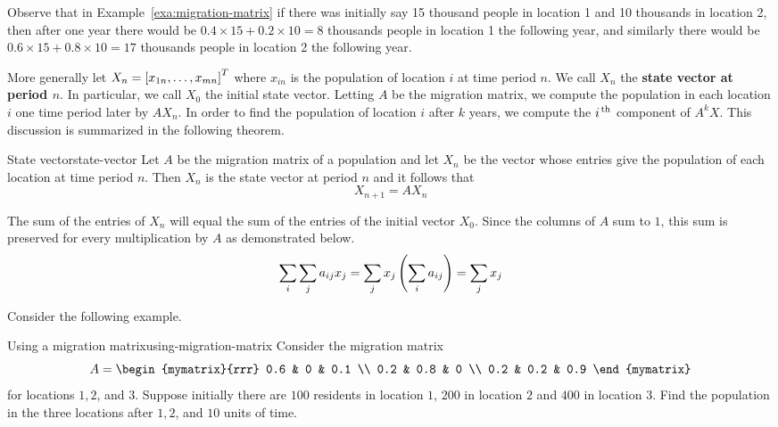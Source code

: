 Observe that in Example~\ref{exa:migration-matrix} if there was initially say 15
thousand people in location 1 and 10 thousands in location 2, then
after one year there would be $0.4 \times 15 + 0.2 \times 10 = 8$
thousands people in location 1 the following year, and similarly 
there would be $0.6 \times 15 + 0.8 \times 10 = 17$
thousands people in location 2 the following year.

More generally let $X_n=\left[x_{1n}, \ldots, x_{mn}\right] ^{T}$ where $x_{in}$ is the
population of location $i$ at time period $n$. We call $X_n$ the \textbf{state vector at period $n$}. In particular, we call $X_0$ the initial state vector. Letting $A$ be the migration matrix, we compute the population in each location $i$ one time period later by $AX_n$. In order to find the population of location $i$ after $k$
years, we compute the $i^{\,\rm th}$ component of $A^{k}X$. This discussion is summarized in the following theorem. 

\begin{theorem}{State vector}{state-vector}
Let $A$ be the migration matrix of a population and let $X_n$ be the vector whose entries give the population of each location at time period $n$. Then $X_n$ is the state vector at period $n$ and it follows that 
\[
X_{n+1} = A X_n
\]
\end{theorem}

The sum of the entries of $X_n$ will equal the sum of the entries of the initial
vector $X_{0}$. Since the columns of $A$ sum to $1$, this sum is preserved for every
multiplication by $A$ as demonstrated below. 
\begin{equation*}
\sum_{i}\sum_{j}a_{ij}x_{j}=\sum_{j}x_{j}\left(\sum_{i}a_{ij}\right)
=\sum_{j}x_{j}
\end{equation*}

Consider the following example.

\begin{example}{Using a migration matrix}{using-migration-matrix}
Consider the migration matrix 
\begin{equation*}
A = 
\begin{mymatrix}{rrr}
0.6 & 0 & 0.1 \\
0.2 & 0.8 & 0 \\
0.2 & 0.2 & 0.9
\end{mymatrix} 
\end{equation*}
 for locations $1,2$, and $3$. Suppose initially there are $100$
residents in location $1$, $200$ in location $2$ and $400$ in location $3$. Find the
population in the three locations after $1,2$, and $10$ units of time.
\end{example}

